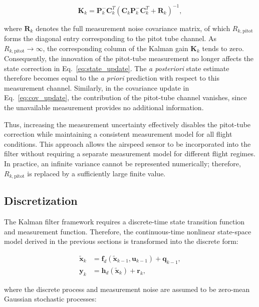 \begin{equation}
	\bm{K}_k
	=
	\bm{P}_k^-\bm{C}_k^T
	\left(
	\bm{C}_k\bm{P}_k^-\bm{C}_k^T+\bm{R}_k
	\right)^{-1},
\end{equation}

where $\bm{R}_k$ denotes the full measurement noise covariance matrix, of which $R_{k, \mathrm{pitot}}$ forms the diagonal entry corresponding to the pitot tube channel. As $R_{k, \mathrm{pitot}} \rightarrow \infty$, the corresponding column of the Kalman gain $\bm{K}_k$ tends to zero.
Consequently, the innovation of the pitot-tube measurement no longer affects
the state correction in Eq.~\eqref{eq:state_update}. The \emph{a posteriori}
state estimate therefore becomes equal to the \emph{a priori} prediction with
respect to this measurement channel. 
Similarly, in the covariance update in Eq.~\eqref{eq:cov_update}, the contribution of the pitot-tube channel vanishes, since the unavailable measurement provides no additional information.

Thus, increasing the measurement uncertainty effectively disables the
pitot-tube correction while maintaining a consistent measurement model for all
flight conditions. This approach allows the airspeed sensor to be incorporated into the filter without requiring a separate measurement model for different flight regimes. In practice, an infinite variance cannot be represented
numerically; therefore, $R_{k,\mathrm{pitot}}$ is replaced by a sufficiently
large finite value.





\subsection{Discretization}
\label{sec:3.1.4Discretization}

The Kalman filter framework requires a discrete-time state transition function and measurement function. Therefore, the continuous-time nonlinear state-space model derived in the previous sections is transformed into the discrete form:

\begin{align}
	\tilde{\bm{x}}_k 
	&= 
	\bm{f}_d(\tilde{\bm{x}}_{k-1}, \bm{u}_{k-1}) + \bm{q}_{k-1}, 
	\\[4pt]
	\bm{y}_k 
	&= 
	\bm{h}_d(\tilde{\bm{x}}_k) + \bm{r}_k,
\end{align}

where the discrete process and measurement noise are assumed to be zero-mean Gaussian stochastic processes:


